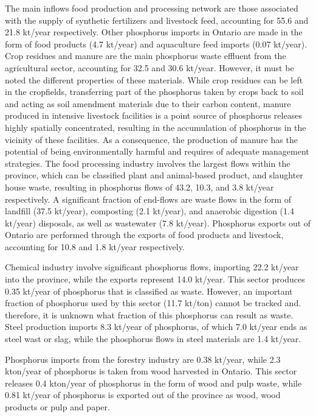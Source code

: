 \documentclass[authoryear]{elsarticle}
\begin{document}
The main inflows food production and processing network are those associated with the supply of synthetic fertilizers and livestock feed, accounting for 55.6 and 21.8 kt/year respectively. Other phosphorus imports in Ontario are made in the form of food products (4.7 kt/year) and aquaculture feed imports (0.07 kt/year). Crop residues and manure are the main phosphorus waste effluent from the agricultural sector, accounting for 32.5 and 30.6 kt/year. However, it must be noted the different properties of these materials. While crop residues can be left in the cropfields, transferring part of the phosphorus taken by crops back to soil and acting as soil amendment materials due to their carbon content, manure produced in intensive livestock facilities is a point source of phosphorus releases highly spatially concentrated, resulting in the accumulation of phosphorus in the vicinity of these facilities. As a consequence, the production of manure has the potential of being environmentally harmful and requires of adequate management strategies. The food processing industry involves the largest flows within the province, which can be classified plant and animal-based product, and slaughter house waste, resulting in phosphorus flows of 43.2, 10.3, and 3.8 kt/year respectively. A significant fraction of end-flows are waste flows in the form of landfill (37.5 kt/year), composting (2.1 kt/year), and anaerobic digestion (1.4 kt/year) disposals, as well as wastewater (7.8 kt/year). Phosphorus exports out of Ontario are performed through the exports of food products and livestock, accounting for 10.8 and 1.8 kt/year respectively.

Chemical industry involve significant phosphorus flows, importing 22.2 kt/year into the province, while the exports represent 14.0 kt/year. This sector produces 0.35 kt/year of phosphorus that is classified as waste. However, an important fraction of phosphorus used by this sector (11.7 kt/ton) cannot be tracked and. therefore, it is unknown what fraction of this phosphorus can result as waste.  Steel production imports 8.3 kt/year of phosphorus, of which 7.0 kt/year ends as steel wast or slag, while the phosphorus flows in steel materials are 1.4 kt/year.

Phosphorus imports from the forestry industry are 0.38 kt/year, while 2.3 kton/year of phosphorus is taken from wood harvested in Ontario. This sector releases 0.4 kton/year of phosphorus in the form of wood and pulp waste, while 0.81 kt/year of phosphorus is exported out of the province as wood, wood products or pulp and paper.
\end{document}
